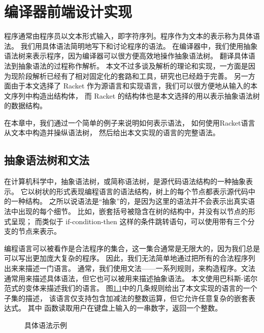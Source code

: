 
\chapter{编译器前端设计实现}

程序通常由程序员以文本形式输入，即字符序列。程序作为文本的表示称为具体语法。
我们用具体语法简明地写下和讨论程序的语法。
在编译器中，我们使用抽象语法树来表示程序，因为编译器可以很方便高效地操作抽象语法树。
翻译具体语法到抽象语法的过程称作解析。
本文不过多谈及解析的理论和实现，一方面是因为现阶段解析已经有了相对固定化的套路和工具，研究也已经趋于完善。
另一方面由于本文选择了 Racket 作为源语言和实现语言，我们可以很方便地从输入的本文序列中构造出结构体，
而 Racket 的结构体也是本文选择的用以表示抽象语法树的数据结构。

在本章中，我们通过一个简单的例子来说明如何表示语法，
如何使用Racket语言从文本中构造并操纵语法树，
然后给出本文实现的语言的完整语法。

\section{抽象语法树和文法}

在计算机科学中，抽象语法树，或简称语法树，是源代码语法结构的一种抽象表示。
它以树状的形式表现编程语言的语法结构，树上的每个节点都表示源代码中的一种结构。
之所以说语法是“抽象”的，是因为这里的语法并不会表示出真实语法中出现的每个细节。
比如，嵌套括号被隐含在树的结构中，并没有以节点的形式呈现；
而类似于 if-condition-then 这样的条件跳转语句，可以使用带有三个分支的节点来表示。

编程语言可以被看作是合法程序的集合，这一集合通常是无限大的，因为我们总是可以写出更加庞大复杂的程序。
因此，我们无法简单地通过把所有的合法程序列出来来描述一门语言。
通常，我们使用文法——一系列规则，来构造程序。文法通常用来描述具体语法，但它也可以被用来描述抽象语法。
本文使用巴科斯-诺尔范式\cite{Knuth_1964, Backus_Bauer_1960}的变体来描述我们的语言。
图\ref{fig:con-syntax-eg}中的几条规则给出了本文实现的语言的一个子集的描述，
该语言仅支持包含加减法的整数运算，但它允许任意复杂的嵌套表达式。
其中  函数读取用户在键盘上输入的一串数字，返回一个整数。

\begin{figure}[t]
  \caption{具体语法示例}
  \label{fig:con-syntax-eg}
\end{figure}

